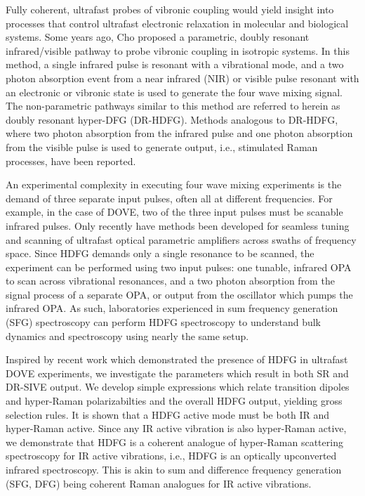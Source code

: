 \documentclass[aip, jcp, reprint, onecolumn]{revtex4-2}
\begin{document}
Fully coherent, ultrafast probes of vibronic coupling would yield insight into processes that control ultrafast electronic relaxation in molecular and biological systems. \cite{Bredenbeck2015, Arsenault2021}
Some years ago, Cho proposed a parametric, doubly resonant infrared/visible pathway to probe vibronic coupling in isotropic systems. \cite{Cho2001}
In this method, a single infrared pulse is resonant with a vibrational mode, and a two photon absorption event from a near infrared (NIR) or visible pulse resonant with an electronic or vibronic state is used to generate the four wave mixing signal.
The non-parametric pathways similar to this method are referred to herein as doubly resonant hyper-DFG (DR-HDFG).
Methods analogous to DR-HDFG, where two photon absorption from the infrared pulse and one photon absorption from the visible pulse is used to generate output, i.e., stimulated Raman processes, have been reported. \cite{RN301, RN120} 

An experimental complexity in executing four wave mixing experiments is the demand of three separate input pulses, often all at different frequencies.
For example, in the case of DOVE, two of the three input pulses must be scanable infrared pulses. \cite{RN345} 
Only recently have methods been developed for seamless tuning and scanning of ultrafast optical parametric amplifiers across swaths of frequency space. \cite{RN162, McDonnell2024, SkyeOPA, KyleOPA}
Since HDFG demands only a single resonance to be scanned, the experiment can be performed using two input pulses: one tunable, infrared OPA to scan across vibrational resonances, and a two photon absorption from the signal process of a separate OPA, or output from the oscillator which pumps the infrared OPA.
As such, laboratories experienced in sum frequency generation (SFG) spectroscopy can perform HDFG spectroscopy to understand bulk dynamics and spectroscopy using nearly the same setup.\cite{Shen1987_CPL}

Inspired by recent work which demonstrated the presence of HDFG in ultrafast DOVE experiments,\cite{McDonnell2024} we investigate the parameters which result in both SR and DR-SIVE output. \cite{Cho2000, Bonn2024}
We develop simple expressions which relate transition dipoles and hyper-Raman polarizabilties and the overall HDFG output, yielding gross selection rules. 
It is shown that a HDFG active mode must be both IR and hyper-Raman active.
Since any IR active vibration is also hyper-Raman active, \cite{Andrews1978} we demonstrate that HDFG is a coherent analogue of hyper-Raman scattering spectroscopy for IR active vibrations, i.e., HDFG is an optically upconverted infrared spectroscopy.
This is akin to sum and difference frequency generation (SFG, DFG) being coherent Raman analogues for IR active vibrations. \cite{Shen90}
\end{document}
